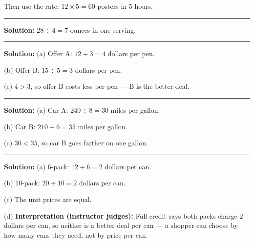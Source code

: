 \documentclass[12pt]{article}
\begin{document}
Then use the rate: $12 \times 5 = 60$ posters in 5 hours. 

\vspace{0.3cm}\noindent\rule{\linewidth}{0.2pt}\vspace{0.3cm}


\textbf{Solution:} $28 \div 4 = 7$ ounces in one serving. 

\vspace{0.3cm}\noindent\rule{\linewidth}{0.2pt}\vspace{0.3cm}


\textbf{Solution:} (a) Offer A: $12 \div 3 = 4$ dollars per pen. 

(b) Offer B: $15 \div 5 = 3$ dollars per pen. 

(c) $4 > 3$, so offer B costs less per pen — B is the better
deal. 

\vspace{0.3cm}\noindent\rule{\linewidth}{0.2pt}\vspace{0.3cm}


\textbf{Solution:} (a) Car A: $240 \div 8 = 30$ miles per gallon. 

(b) Car B: $210 \div 6 = 35$ miles per gallon. 

(c) $30 < 35$, so car B goes farther on one gallon. 

\vspace{0.3cm}\noindent\rule{\linewidth}{0.2pt}\vspace{0.3cm}


\textbf{Solution:} (a) 6-pack: $12 \div 6 = 2$ dollars per can. 

(b) 10-pack: $20 \div 10 = 2$ dollars per can. 

(c) The unit prices are equal. 

(d) \textbf{Interpretation (instructor judges):} Full credit says both packs
charge 2 dollars per can, so neither is a better deal per can — a shopper can
choose by how many cans they need, not by price per can.
\end{document}
